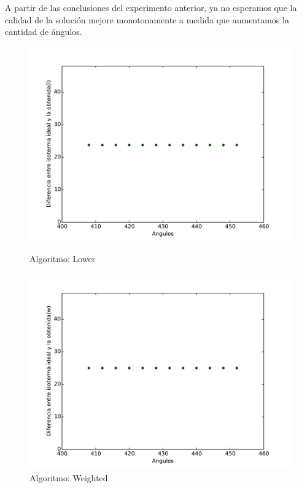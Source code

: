 A partir de las conclusiones del experimento anterior, ya no esperamos que la calidad de la solución mejore monotonamente a medida que aumentamos la cantidad de ángulos.

\begin{figure}[h]
  \centering
  \begin{minipage}[b]{0.49\textwidth}
    \includegraphics[width=\textwidth]{graficos/nVariable_l.pdf}
    \caption{Algoritmo: Lower}
  \end{minipage}
  \hfill
  \begin{minipage}[b]{0.49\textwidth}
    \includegraphics[width=\textwidth]{graficos/nVariable_w.pdf}
    \caption{Algoritmo: Weighted}
  \end{minipage}
\end{figure}


